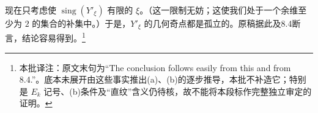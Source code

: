 \documentclass[openany]{ctexbook}
\newcommand{\note}[1]{\footnote{本批译注：#1}}
\begin{document}
现在只考虑使 $\operatorname{sing}(Y'_\xi)$ 有限的 $\xi$。（这一限制无妨；这使我们处于一个余维至少为 $2$ 的集合的补集中。）于是，$Y'_\xi$ 的几何奇点都是孤立的。原稿据此及8.4断言，结论容易得到。\note{原文末句为“The conclusion follows easily from this and from 8.4.”。底本未展开由这些事实推出(a)、(b)的逐步推导，本批不补造它；特别是 $E_k$ 记号、(b)条件及“直纹”含义仍待核，故不能将本段标作完整独立审定的证明。}
\end{document}
